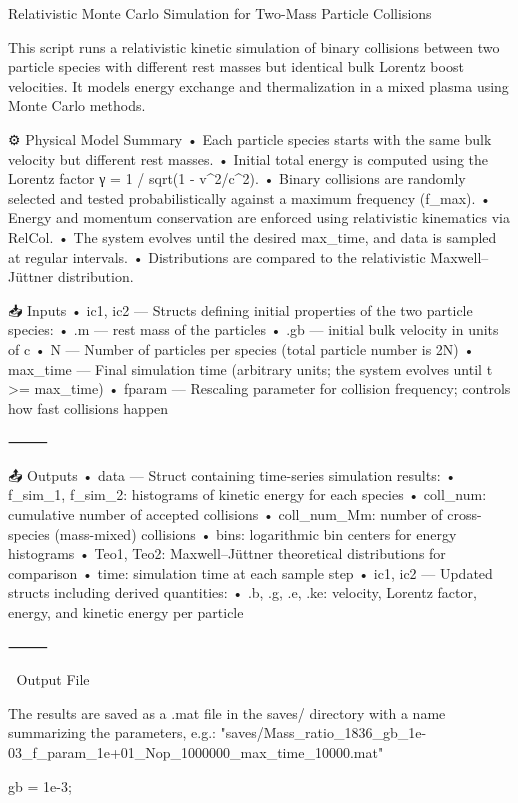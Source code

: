 Relativistic Monte Carlo Simulation for Two-Mass Particle Collisions

This script runs a relativistic kinetic simulation of binary collisions between two particle species with different rest masses but identical bulk Lorentz boost velocities. It models energy exchange and thermalization in a mixed plasma using Monte Carlo methods.

⚙️ Physical Model Summary
	•	Each particle species starts with the same bulk velocity but different rest masses.
	•	Initial total energy is computed using the Lorentz factor γ = 1 / sqrt(1 - v^2/c^2).
	•	Binary collisions are randomly selected and tested probabilistically against a maximum frequency (f_max).
	•	Energy and momentum conservation are enforced using relativistic kinematics via RelCol.
	•	The system evolves until the desired max_time, and data is sampled at regular intervals.
	•	Distributions are compared to the relativistic Maxwell–Jüttner distribution.


📥 Inputs
	•	ic1, ic2 — Structs defining initial properties of the two particle species:
	•	.m  — rest mass of the particles
	•	.gb — initial bulk velocity in units of c
	•	N — Number of particles per species (total particle number is 2N)
	•	max_time — Final simulation time (arbitrary units; the system evolves until t >= max_time)
	•	fparam — Rescaling parameter for collision frequency; controls how fast collisions happen

⸻

📤 Outputs
	•	data — Struct containing time-series simulation results:
	•	f_sim_1, f_sim_2: histograms of kinetic energy for each species
	•	coll_num: cumulative number of accepted collisions
	•	coll_num_Mm: number of cross-species (mass-mixed) collisions
	•	bins: logarithmic bin centers for energy histograms
	•	Teo1, Teo2: Maxwell–Jüttner theoretical distributions for comparison
	•	time: simulation time at each sample step
	•	ic1, ic2 — Updated structs including derived quantities:
	•	.b, .g, .e, .ke: velocity, Lorentz factor, energy, and kinetic energy per particle

⸻




📁 Output File

The results are saved as a .mat file in the saves/ directory with a name summarizing the parameters, e.g.:
 "saves/Mass_ratio_1836_gb_1e-03_f_param_1e+01_Nop_1000000_max_time_10000.mat"



gb = 1e-3;

